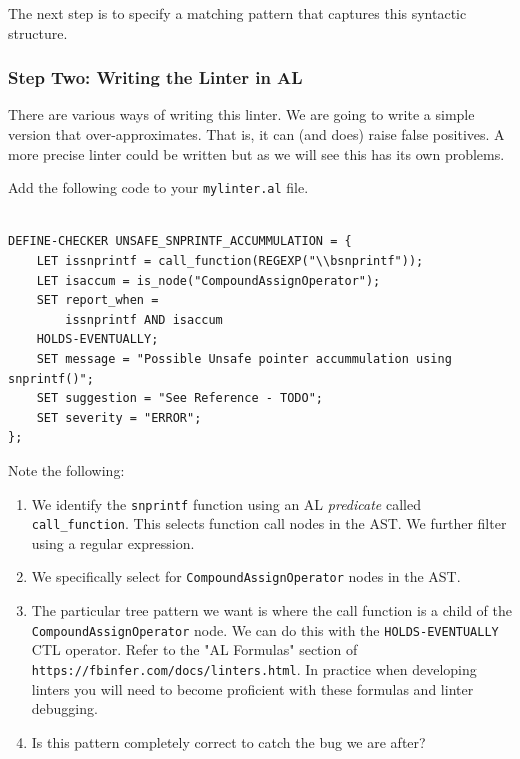 The next step is to specify a matching pattern that captures this syntactic structure.

\subsubsection{Step Two: Writing the Linter in AL}

There are various ways of writing this linter. 
We are going to write a simple version that over-approximates. That is, it can (and does) raise 
false positives. A more precise linter could be written but as we will see this has 
its own problems.

Add the following code to your \verb|mylinter.al| file.

\begin{verbatim}

DEFINE-CHECKER UNSAFE_SNPRINTF_ACCUMMULATION = {
    LET issnprintf = call_function(REGEXP("\\bsnprintf"));
    LET isaccum = is_node("CompoundAssignOperator");
    SET report_when = 
        issnprintf AND isaccum
    HOLDS-EVENTUALLY;
    SET message = "Possible Unsafe pointer accummulation using snprintf()";
    SET suggestion = "See Reference - TODO";
    SET severity = "ERROR";
};
\end{verbatim}

Note the following:
\begin{enumerate}
	\item We identify the \verb|snprintf| function using an AL \textit{predicate} called
	\verb|call_function|. This selects function call nodes in the AST. We further filter
	using a regular expression.
	\item We specifically select for \verb|CompoundAssignOperator| nodes in the AST.
	\item The particular tree pattern we want is where the call function is a child 
	of the \verb|CompoundAssignOperator| node. We can do this with the \verb|HOLDS-EVENTUALLY|
	CTL operator. Refer to the "AL Formulas" section of\\
	 \verb|https://fbinfer.com/docs/linters.html|. 
	In practice when developing linters you will need to become proficient with these formulas
	and linter debugging.
	\item Is this pattern completely correct to catch the bug we are after?	
\end{enumerate}


